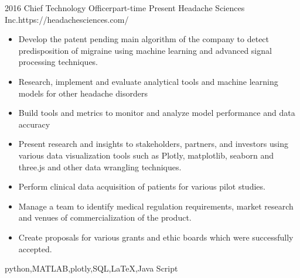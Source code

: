 \begin{experiences}
	\myExperience
	{2016}       {Chief Technology Officer}{part-time}
	{Present}      {Headache Sciences Inc.}{https://headachesciences.com/}
	{
		\begin{itemize}
			\item Develop the patent pending main algorithm of the company to detect predisposition of migraine using machine learning and advanced signal processing techniques.
			\item Research, implement and evaluate analytical tools and machine learning models for other headache disorders
			\item Build tools and metrics to monitor and analyze model performance and data accuracy
			\item Present research and insights to stakeholders, partners, and investors using various data visualization tools such as Plotly, matplotlib, seaborn and three.js and other data wrangling techniques.
			\item Perform clinical data acquisition of patients for various pilot studies.
			\item Manage a team to identify medical regulation requirements, market research and venues of commercialization of the product.
			\item Create proposals for various grants and ethic boards which were successfully accepted.
		\end{itemize}
	}
	{python,MATLAB,plotly,SQL,\LaTeX,Java Script}
	
\end{experiences}
